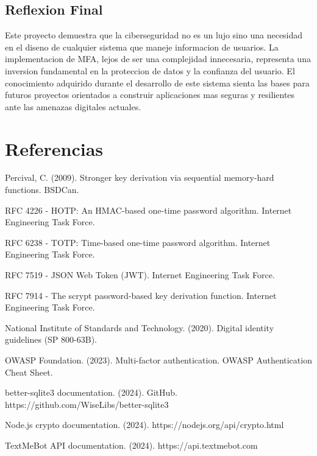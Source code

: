 \documentclass[12pt,a4paper]{article}
\begin{document}
\subsection{Reflexion Final}

Este proyecto demuestra que la ciberseguridad no es un lujo sino una necesidad en el diseno de cualquier sistema que maneje informacion de usuarios. La implementacion de MFA, lejos de ser una complejidad innecesaria, representa una inversion fundamental en la proteccion de datos y la confianza del usuario. El conocimiento adquirido durante el desarrollo de este sistema sienta las bases para futuros proyectos orientados a construir aplicaciones mas seguras y resilientes ante las amenazas digitales actuales.

\newpage
\section{Referencias}

\begin{enumerate}[label={[\arabic*]}, leftmargin=*, itemsep=3pt]
    \item Percival, C. (2009). Stronger key derivation via sequential memory-hard functions. BSDCan.
    \item RFC 4226 - HOTP: An HMAC-based one-time password algorithm. Internet Engineering Task Force.
    \item RFC 6238 - TOTP: Time-based one-time password algorithm. Internet Engineering Task Force.
    \item RFC 7519 - JSON Web Token (JWT). Internet Engineering Task Force.
    \item RFC 7914 - The scrypt password-based key derivation function. Internet Engineering Task Force.
    \item National Institute of Standards and Technology. (2020). Digital identity guidelines (SP 800-63B).
    \item OWASP Foundation. (2023). Multi-factor authentication. OWASP Authentication Cheat Sheet.
    \item better-sqlite3 documentation. (2024). GitHub. https://github.com/WiseLibs/better-sqlite3
    \item Node.js crypto documentation. (2024). https://nodejs.org/api/crypto.html
    \item TextMeBot API documentation. (2024). https://api.textmebot.com
\end{enumerate}
\end{document}
